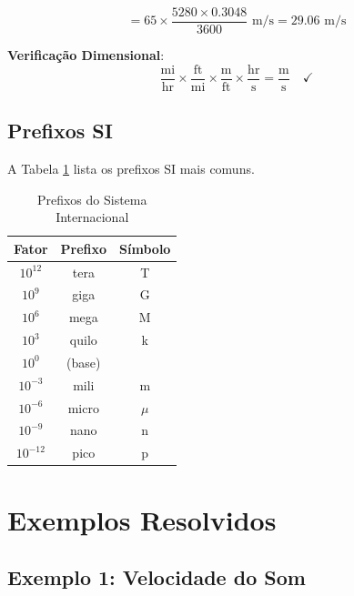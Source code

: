 \documentclass[12pt,a4paper,oneside]{book}
\theoremstyle{definition}
\begin{document}
\begin{equation}
= 65 \times \frac{5280 \times 0.3048}{3600} \text{ m/s} = 29.06 \text{ m/s}
\end{equation}

\textbf{Verificação Dimensional}:
\begin{equation}
\frac{\text{mi}}{\text{hr}} \times \frac{\text{ft}}{\text{mi}} \times \frac{\text{m}}{\text{ft}} \times \frac{\text{hr}}{\text{s}} = \frac{\text{m}}{\text{s}} \quad \checkmark
\end{equation}

\subsection{Prefixos SI}

A Tabela \ref{tab:prefixes} lista os prefixos SI mais comuns.

\begin{table}[h]
\centering
\caption{Prefixos do Sistema Internacional}
\label{tab:prefixes}
\begin{tabular}{ccc}
\toprule
\textbf{Fator} & \textbf{Prefixo} & \textbf{Símbolo} \\
\midrule
$10^{12}$ & tera & T \\
$10^9$ & giga & G \\
$10^6$ & mega & M \\
$10^3$ & quilo & k \\
$10^0$ & (base) & \\
$10^{-3}$ & mili & m \\
$10^{-6}$ & micro & $\mu$ \\
$10^{-9}$ & nano & n \\
$10^{-12}$ & pico & p \\
\bottomrule
\end{tabular}
\end{table}

\section{Exemplos Resolvidos}

\subsection{Exemplo 1: Velocidade do Som}
\end{document}
